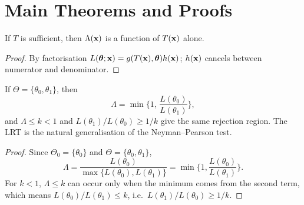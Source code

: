 \documentclass[main.tex]{subfiles}
\begin{document}
\section{Main Theorems and Proofs}

\begin{proposition}
If $T$ is sufficient, then $\Lambda(\mathbf{x})$ is a function of $T(\mathbf{x})$ alone.
\end{proposition}
\begin{proof}
By factorisation $L(\bm\theta;\mathbf{x})=g(T(\mathbf{x}),\bm\theta)h(\mathbf{x})$; $h(\mathbf{x})$ cancels between numerator and denominator.
\end{proof}

\begin{proposition}[For Simple Hypotheses, LRT = NP Test]
If $\Theta=\{\theta_0,\theta_1\}$, then
\[
\Lambda=\min\Big\{1,\,\frac{L(\theta_0)}{L(\theta_1)}\Big\},
\]
and $\Lambda\le k<1$ and $L(\theta_1)/L(\theta_0)\ge1/k$ give the same rejection region. The LRT is the natural generalisation of the Neyman--Pearson test.
\end{proposition}
\begin{proof}
Since $\Theta_0=\{\theta_0\}$ and $\Theta=\{\theta_0,\theta_1\}$,
\[
\Lambda=\frac{L(\theta_0)}{\max\{L(\theta_0),L(\theta_1)\}}=\min\Big\{1,\frac{L(\theta_0)}{L(\theta_1)}\Big\}.
\]
 For $k<1$, $\Lambda\le k$ can occur only when the minimum comes from the second term, which means $L(\theta_0)/L(\theta_1)\le k$, i.e.\ $L(\theta_1)/L(\theta_0)\ge1/k$.
\end{proof}
\end{document}

